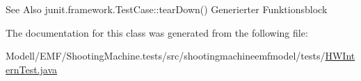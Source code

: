 \begin{DoxySeeAlso}{See Also}
junit.\-framework.\-Test\-Case\-::tear\-Down() Generierter Funktionsblock 
\end{DoxySeeAlso}


The documentation for this class was generated from the following file\-:\begin{DoxyCompactItemize}
\item 
Modell/\-E\-M\-F/\-Shooting\-Machine.\-tests/src/shootingmachineemfmodel/tests/\hyperlink{_h_w_intern_test_8java}{H\-W\-Intern\-Test.\-java}\end{DoxyCompactItemize}
